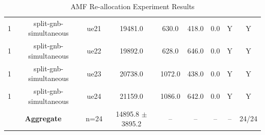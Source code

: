 \begin{table}[ht]
\begin{tabular}{|c|c|c|c|c|c|c|c|c|}
1 & split-gnb-simultaneous & ue21 & 19481.0 & 630.0 & 418.0 & 0.0 & Y & Y \\
1 & split-gnb-simultaneous & ue22 & 19892.0 & 628.0 & 646.0 & 0.0 & Y & Y \\
1 & split-gnb-simultaneous & ue23 & 20738.0 & 1072.0 & 438.0 & 0.0 & Y & Y \\
1 & split-gnb-simultaneous & ue24 & 21159.0 & 1086.0 & 642.0 & 0.0 & Y & Y \\
\multicolumn{2}{|c|}{\textbf{Aggregate}} & n=24 & 14895.8 $\pm$ 3895.2 & -- & -- & -- & -- & 24/24 \\
\hline
\end{tabular}
\caption{AMF Re-allocation Experiment Results}
\label{tab:amf_realloc}
\end{table}
